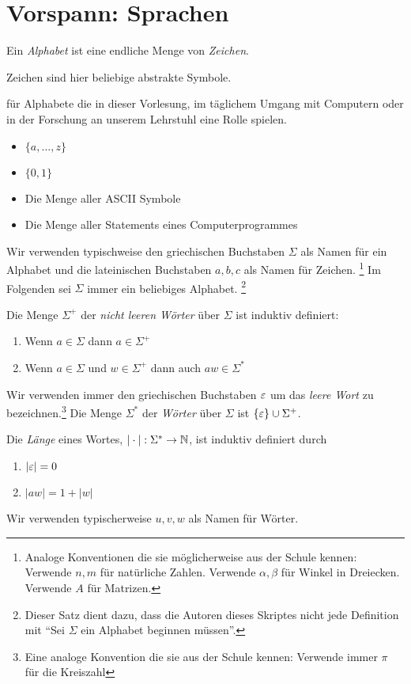 \section[Vorspann: Sprachen]{Vorspann: Sprachen}
\begin{Def}[name={[Alphabet $\Sigma$]}]
	Ein \emph{Alphabet} ist eine endliche Menge von \emph{Zeichen}.
\end{Def} %
Zeichen sind hier beliebige abstrakte Symbole.

\begin{Bsp*} für Alphabete die in dieser Vorlesung, im täglichem Umgang mit Computern oder in der Forschung an unserem Lehrstuhl eine Rolle spielen.
  \begin{itemize}
  \item $\{a,\dots,z\}$
  \item $\{0, 1\}$
  \item Die Menge aller ASCII Symbole
  \item Die Menge aller Statements eines Computerprogrammes
  \end{itemize}
\end{Bsp*}
Wir verwenden typischweise den griechischen Buchstaben $\Sigma$ als Namen für ein Alphabet und die lateinischen Buchstaben $a,b,c$ als Namen für Zeichen.
\footnote{Analoge Konventionen die sie möglicherweise aus der Schule kennen: Verwende $n,m$ für natürliche Zahlen. Verwende $\alpha, \beta$ für Winkel in Dreiecken. Verwende $A$ für Matrizen.}
Im Folgenden sei $\Sigma$ immer ein beliebiges Alphabet.
\footnote{Dieser Satz dient dazu, dass die Autoren dieses Skriptes nicht jede Definition mit ``Sei $\Sigma$ ein Alphabet beginnen müssen''.}

\begin{Def}[name={[Wort $w$ über $\Sigma$]}]\label{def:1.2}
  Die Menge $\Sigma^+$ der \emph{nicht leeren Wörter} über $\Sigma$ ist induktiv definiert:
  \begin{enumerate}
   \item Wenn $a\in\Sigma$ dann $a\in\Sigma^+$
   \item Wenn $a\in\Sigma$ und $w\in\Sigma^+$ dann auch $aw \in \Sigma^*$
  \end{enumerate}
  Wir verwenden immer den griechischen Buchstaben $\varepsilon$ um das \emph{leere Wort} zu bezeichnen.\footnote{Eine analoge Konvention die sie aus der Schule kennen: Verwende immer $\pi$ für die Kreiszahl}
  Die Menge $\Sigma^*$ der \emph{Wörter} über $\Sigma$ ist $\{\varepsilon\}\cup\Sigma^+$.
  
  Die \emph{Länge} eines Wortes, $|\cdot| : \Sigma^* \to \mathbb{N}$, ist induktiv definiert durch
  \begin{enumerate}
  \item $|\varepsilon| = 0$
  \item $|aw| = 1 + |w|$
  \end{enumerate}
\end{Def}
Wir verwenden typischerweise $u,v,w$ als Namen für Wörter.

